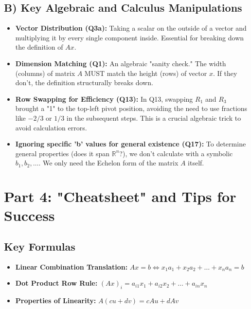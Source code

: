 \documentclass{article}
\begin{document}
\subsection{B) Key Algebraic and Calculus Manipulations}
\begin{itemize}
    \item \textbf{Vector Distribution (Q3a):} Taking a scalar on the outside of a vector and multiplying it by every single component inside. Essential for breaking down the definition of $Ax$.
    \item \textbf{Dimension Matching (Q1):} An algebraic "sanity check." The width (columns) of matrix $A$ MUST match the height (rows) of vector $x$. If they don't, the definition structurally breaks down.
    \item \textbf{Row Swapping for Efficiency (Q13):} In Q13, swapping $R_1$ and $R_3$ brought a "1" to the top-left pivot position, avoiding the need to use fractions like $-2/3$ or $1/3$ in the subsequent steps. This is a crucial algebraic trick to avoid calculation errors.
    \item \textbf{Ignoring specific 'b' values for general existence (Q17):} To determine general properties (does it span $\mathbb{R}^n$?), we don't calculate with a symbolic $b_1, b_2, \dots$. We only need the Echelon form of the matrix $A$ itself. 
\end{itemize}

\newpage
\section{Part 4: "Cheatsheet" and Tips for Success}

\subsection{Key Formulas}
\begin{itemize}
    \item \textbf{Linear Combination Translation:} $Ax = b \iff x_1a_1 + x_2a_2 + \dots + x_na_n = b$
    \item \textbf{Dot Product Row Rule:} $(Ax)_i = a_{i1}x_1 + a_{i2}x_2 + \dots + a_{in}x_n$
    \item \textbf{Properties of Linearity:} $A(cu + dv) = cAu + dAv$
\end{itemize}
\end{document}
